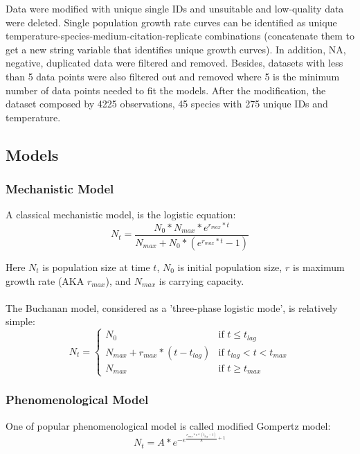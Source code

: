 \documentclass[11pt]{article}
\begin{document}
Data were modified with unique single IDs and unsuitable and low-quality data were deleted. Single population growth rate curves can be identified as unique temperature-species-medium-citation-replicate combinations (concatenate them to get a new string variable that identifies unique growth curves).  In addition, NA, negative, duplicated data were filtered and removed. Besides, datasets with less than 5 data points were also filtered out and removed where 5 is the minimum number of data points needed to fit the models. After the modification, the dataset composed by 4225 observations, 45 species with 275 unique IDs and temperature. 

\subsection{Models}
\subsubsection{Mechanistic Model}
 A classical mechanistic model, is the logistic equation:
 \begin{equation}
N_t = \frac{N_0 * N_{max} * e^{r_{max} * t}} {N_{max} + N_0 * (e^{r_{max} * t} - 1)}
\end{equation}

Here $N_t$  is population size at time $t$, $N_0$ is initial population size, $r$ is maximum growth rate (AKA $r_{max}$), and $N_{max}$ is carrying capacity.

\paragraph{} The Buchanan model, considered as a 'three-phase logistic mode', is relatively simple:
\begin{equation}
    N_t = \begin{cases}
          N_0 & \text{if } t\leq t_{lag}\\
          N_{max} + r_{max} * (t - t_{lag})  & \text{if } t_{lag} < t < t_{max}\\
          N_{max} & \text{if } t\geq t_{max}
          \end{cases} \label{eq:Buchanan Model} \tag{2}
\end{equation}

\subsubsection{Phenomenological Model}
One of popular phenomenological model is called modified Gompertz model\citep{R10}: 
\begin{equation}
N_t = A*e^{-e^{\frac{r_{max}*e*(t_{lag} - t)}{A} + 1}} \tag{3}
\end{equation}
\end{document}
